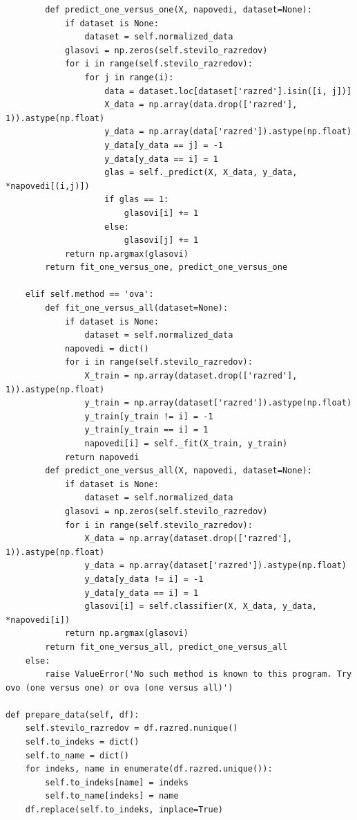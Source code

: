 \documentclass[mat1]{fmfdelo}
\begin{document}
\begin{scriptsize}
\begin{verbatim}
        def predict_one_versus_one(X, napovedi, dataset=None):
            if dataset is None:
                dataset = self.normalized_data
            glasovi = np.zeros(self.stevilo_razredov)
            for i in range(self.stevilo_razredov):
                for j in range(i):
                    data = dataset.loc[dataset['razred'].isin([i, j])]
                    X_data = np.array(data.drop(['razred'], 1)).astype(np.float)
                    y_data = np.array(data['razred']).astype(np.float)
                    y_data[y_data == j] = -1
                    y_data[y_data == i] = 1
                    glas = self._predict(X, X_data, y_data, *napovedi[(i,j)])
                    if glas == 1:
                        glasovi[i] += 1
                    else:
                        glasovi[j] += 1
            return np.argmax(glasovi)
        return fit_one_versus_one, predict_one_versus_one
    
    elif self.method == 'ova':
        def fit_one_versus_all(dataset=None):
            if dataset is None:
                dataset = self.normalized_data
            napovedi = dict()
            for i in range(self.stevilo_razredov):
                X_train = np.array(dataset.drop(['razred'], 1)).astype(np.float)
                y_train = np.array(dataset['razred']).astype(np.float)
                y_train[y_train != i] = -1
                y_train[y_train == i] = 1
                napovedi[i] = self._fit(X_train, y_train)
            return napovedi
        def predict_one_versus_all(X, napovedi, dataset=None):
            if dataset is None:
                dataset = self.normalized_data
            glasovi = np.zeros(self.stevilo_razredov)
            for i in range(self.stevilo_razredov):
                X_data = np.array(dataset.drop(['razred'], 1)).astype(np.float)
                y_data = np.array(dataset['razred']).astype(np.float)
                y_data[y_data != i] = -1
                y_data[y_data == i] = 1
                glasovi[i] = self.classifier(X, X_data, y_data, *napovedi[i])
            return np.argmax(glasovi)
        return fit_one_versus_all, predict_one_versus_all
    else: 
        raise ValueError('No such method is known to this program. Try ovo (one versus one) or ova (one versus all)')
        
def prepare_data(self, df):
    self.stevilo_razredov = df.razred.nunique()
    self.to_indeks = dict()
    self.to_name = dict()
    for indeks, name in enumerate(df.razred.unique()):
        self.to_indeks[name] = indeks
        self.to_name[indeks] = name
    df.replace(self.to_indeks, inplace=True)
                  

\end{verbatim}
\end{scriptsize}
\end{document}
